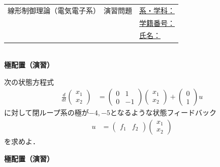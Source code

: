\documentclass[a4paper,11pt]{jreport}
\begin{document}
\newpage

\begin{tabular}{cl}
\hspace*{2cm}
{\large 線形制御理論（電気電子系）　演習問題}
\hspace{1cm}
&
\underline{系・学科：\hspace{3cm}}
\\[2mm]
&\underline{学籍番号：\hspace{3cm}}
\\[2mm]
&\underline{氏名：\hspace{5cm}}
\end{tabular}
\ \\

\noindent
{\bf 極配置（演習）}

次の状態方程式
\begin{align*}
	\frac{d}{dt}
	\left (
	\begin{array}{c}
	 x_1 \\ x_2 
	\end{array}
	\right )
	& = 
	\left (
	\begin{array}{cc}
	 0 & 1 \\
	 0 & -1
	\end{array}
	\right )
	\left (
	\begin{array}{c}
	 x_1 \\ x_2 
	\end{array}
	\right )
	+
	\left (
	\begin{array}{c}
	 0 \\ 1 
	\end{array}
	\right )
	u
\end{align*}
に対して閉ループ系の極が$-4,-5$となるような状態フィードバック
\begin{align*}
	u 
	&=
	\left (
	\begin{array}{cc}
	 f_1 & f_2
	\end{array}
	\right )
	\left (
	\begin{array}{c}
	 x_1 \\ x_2 
	\end{array}
	\right )
\end{align*}
を求めよ．

\newpage

\noindent
{\bf 極配置（演習）}
\end{document}
